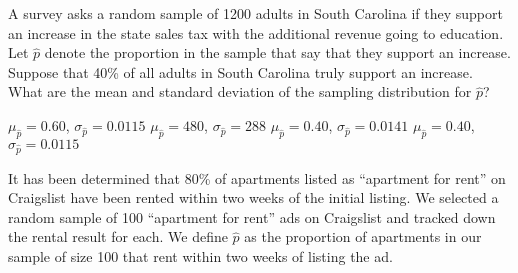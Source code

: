 \documentclass[noanswers]{exam}
\begin{document}
\begin{questions}
\vspace{3mm}

\question A survey asks a random sample of 1200 adults in South Carolina if they support an increase in the state sales tax with the additional revenue going to education. Let $\hat{p}$ denote the proportion in the sample that say that they support an increase. Suppose that 40\% of all adults in South Carolina truly support an increase. What are the mean and standard deviation of the sampling distribution for $\hat{p}$?

\vspace{3mm}

\begin{choices}
\choice $\mu_{\hat{p}}=0.60$, $\sigma_{\hat{p}}=0.0115$
\choice $\mu_{\hat{p}}=480$, $\sigma_{\hat{p}}=288$
\CorrectChoice $\mu_{\hat{p}}=0.40$, $\sigma_{\hat{p}}=0.0141$
\choice $\mu_{\hat{p}}=0.40$, $\sigma_{\hat{p}}=0.0115$
\end{choices}

\vspace{3mm} 

\question It has been determined that 80\% of apartments listed as ``apartment for rent'' on Craigslist have been rented within two weeks of the initial listing. We selected a random sample of 100 ``apartment for rent'' ads on Craigslist and tracked down the rental result for each. We define $\hat{p}$ as the proportion of apartments in our sample of size 100 that rent within two weeks of listing the ad.

\vspace{3mm}

\end{questions}
\end{document}
